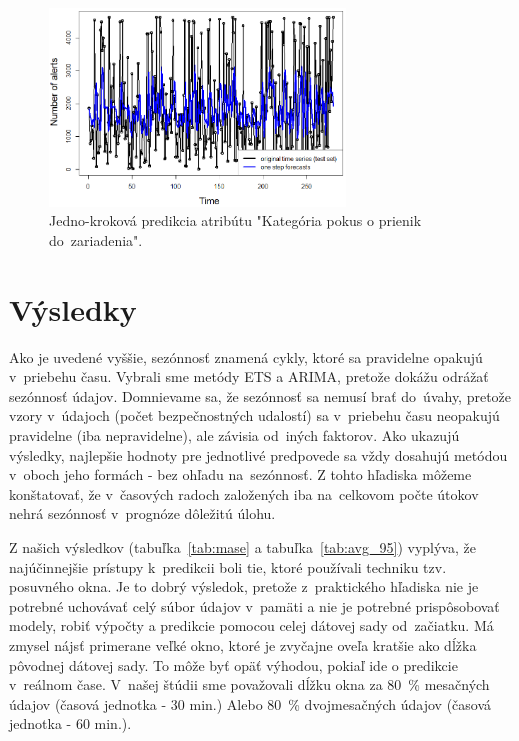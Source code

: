 \documentclass[thesismargins, thesislinespacing, openright, upjsfrontpage]{rnthesis}
\begin{document}
\begin{figure}[h]
  \centering
  \includegraphics[width=0.7\textwidth]{images/item62_1step_forecasts_new.eps}
  \caption{Jedno-kroková predikcia atribútu "Kategória pokus o prienik do~zariadenia". }
  \label{fig:forecast_attempt_exploit}
\end{figure}

\section{Výsledky}

Ako je uvedené vyššie, sezónnosť znamená cykly, ktoré sa pravidelne opakujú v~priebehu času. Vybrali sme metódy ETS a ARIMA, pretože dokážu odrážať sezónnosť údajov. Domnievame sa, že sezónnosť sa nemusí brať do~úvahy, pretože vzory v~údajoch (počet bezpečnostných udalostí) sa v~priebehu času neopakujú pravidelne (iba nepravidelne), ale závisia od~iných faktorov. Ako ukazujú výsledky, najlepšie hodnoty pre jednotlivé predpovede sa vždy dosahujú metódou v~oboch jeho formách - bez ohľadu na~sezónnosť. Z tohto hľadiska môžeme konštatovať, že v~časových radoch založených iba na~celkovom počte útokov nehrá sezónnosť v~prognóze dôležitú úlohu.

Z našich výsledkov (tabuľka~\ref{tab:mase} a tabuľka~\ref{tab:avg_95}) vyplýva, že najúčinnejšie prístupy k~predikcii boli tie, ktoré používali techniku tzv. posuvného okna. Je to dobrý výsledok, pretože z~praktického hľadiska nie je potrebné uchovávať celý súbor údajov v~pamäti a nie je potrebné prispôsobovať modely, robiť výpočty a predikcie pomocou celej dátovej sady od~začiatku. Má zmysel nájsť primerane veľké okno, ktoré je zvyčajne oveľa kratšie ako dĺžka pôvodnej dátovej sady. To môže byť opäť výhodou, pokiaľ ide o predikcie v~reálnom čase. V~našej štúdii sme považovali dĺžku okna za 80~\% mesačných údajov (časová jednotka - 30 min.) Alebo 80~\% dvojmesačných údajov (časová jednotka - 60 min.).
\end{document}
